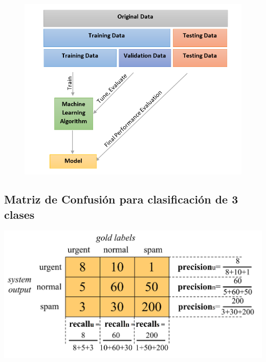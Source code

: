 \begin{figure}[htb]
	\centering
	 \includegraphics[scale=0.55]{pics/validation.png}
\end{figure}



\subsection{Matriz de Confusión para clasificación de 3 clases}


\begin{center}
\includegraphics[scale=0.23]{pics/confmatrix.png}
\end{center}

